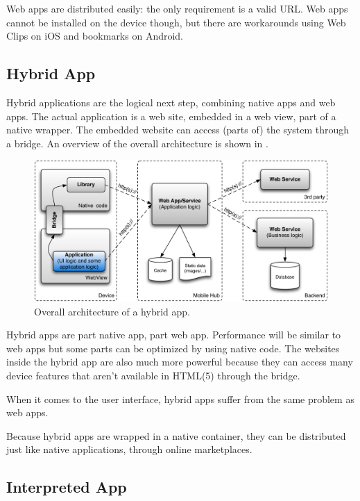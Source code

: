 Web apps are distributed easily: the only requirement is a valid URL. Web apps cannot be installed on the device though, but there are workarounds using Web Clips on iOS \cite{Safari:webclips} and bookmarks on Android. 

\subsection{Hybrid App}

Hybrid applications are the logical next step, combining native apps and web apps. The actual application is a web site, embedded in a web view, part of a native wrapper. The embedded website can access (parts of) the system through a bridge. An overview of the overall architecture is shown in . 

\begin{figure}[h!]
    \begin{center}
        \includegraphics[width=\textwidth]{figs/hybrid.pdf}
        \caption{
            Overall architecture of a hybrid app.
        }
        \label{fig:hybrid}
    \end{center}
\end{figure}

Hybrid apps are part native app, part web app. Performance will be similar to web apps but some parts can be optimized by using native code. The websites inside the hybrid app are also much more powerful because they can access many device features that aren't available in HTML(5) through the bridge.

When it comes to the user interface, hybrid apps suffer from the same problem as web apps. 

Because hybrid apps are wrapped in a native container, they can be distributed just like native applications, through online marketplaces. 

\subsection{Interpreted App}

